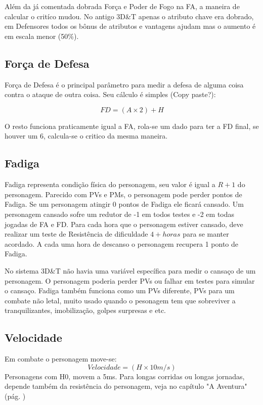 \begin{framed}
Além da já comentada dobrada Força e Poder de Fogo na FA, a maneira de calcular o critíco mudou. No antigo 3D\&T apenas o atributo chave era dobrado, em Defensores todos os bônus de atributos e vantagens ajudam mas o aumento é em escala menor (50\%).
\end{framed}

\subsection{Força de Defesa}

Força de Defesa é o principal parâmetro para medir a defesa de alguma coisa contra o ataque de outra coisa. Seu cálculo é simples (Copy paste?):

\[ FD = (A \times 2) + H \]

O resto funciona praticamente igual a FA, rola-se um dado para ter a FD final, se houver um 6, calcula-se o critico da mesma maneira.

\subsection{Fadiga}

Fadiga representa condição física do personagem, seu valor é igual a \( R + 1 \) do personagem. Parecido com PVs e PMs, o personagem pode perder pontos de Fadiga. Se um personagem atingir 0 pontos de Fadiga ele ficará cansado. Um personagem cansado sofre um redutor de -1 em todos testes e -2 em todas jogadas de FA e FD. Para cada hora que o personagem estiver cansado, deve realizar um teste de Resistência de dificuldade \( 4 + horas  \) para se manter acordado. A cada uma hora de descanso o personagem recupera 1 ponto de Fadiga.

\begin{framed}
No sistema 3D\&T não havia uma variável específica para medir o cansaço de um personagem. O personagem poderia perder PVs ou falhar em testes para simular o cansaço. Fadiga também funciona como um PVs diferente, PVs para um combate não letal, muito usado quando o pesonagem tem que sobreviver a tranquilizantes, imobilização, golpes surpresas e etc.
\end{framed}


\subsection{Velocidade}
Em combate o personagem move-se:
\[ Velocidade = (H \times 10m/s) \]
Personagens com H0, movem a 5m\/s. Para longas corridas ou longas jornadas, depende também da resistência do personagem, veja no capítulo "A Aventura"(pág. \pageref{ch:adventure}) 

